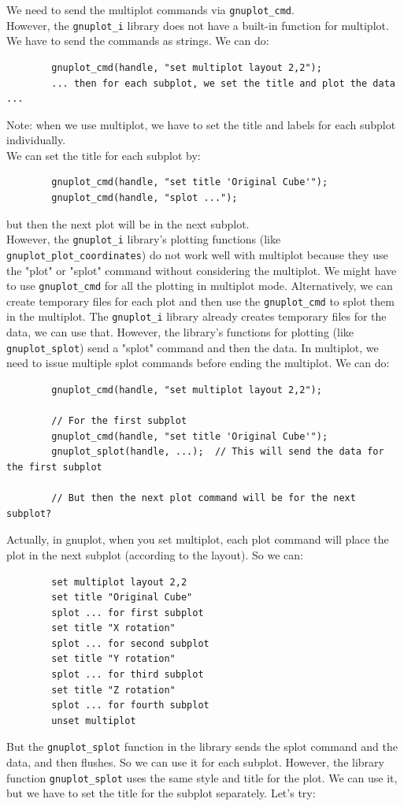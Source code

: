 \documentclass[a4paper,10pt]{article}
\begin{document}
We need to send the multiplot commands via \verb|gnuplot_cmd|.\\
However, the \verb|gnuplot_i| library does not have a built-in function for multiplot. We have to send the commands as strings.
We can do:
\begin{verbatim}
        gnuplot_cmd(handle, "set multiplot layout 2,2");
        ... then for each subplot, we set the title and plot the data ...
\end{verbatim}
Note: when we use multiplot, we have to set the title and labels for each subplot individually.\\
We can set the title for each subplot by:
\begin{verbatim}
        gnuplot_cmd(handle, "set title 'Original Cube'");
        gnuplot_cmd(handle, "splot ...");
\end{verbatim}
but then the next plot will be in the next subplot.\\
However, the \verb|gnuplot_i| library's plotting functions (like \verb|gnuplot_plot_coordinates|) do not work well with multiplot because they use the "plot" or "splot" command without considering the multiplot.
We might have to use \verb|gnuplot_cmd| for all the plotting in multiplot mode.
Alternatively, we can create temporary files for each plot and then use the \verb|gnuplot_cmd| to splot them in the multiplot.
The \verb|gnuplot_i| library already creates temporary files for the data, we can use that.
However, the library's functions for plotting (like \verb|gnuplot_splot|) send a "splot" command and then the data. In multiplot, we need to issue multiple splot commands before ending the multiplot.
We can do:
\begin{verbatim}
        gnuplot_cmd(handle, "set multiplot layout 2,2");

        // For the first subplot
        gnuplot_cmd(handle, "set title 'Original Cube'");
        gnuplot_splot(handle, ...);  // This will send the data for the first subplot

        // But then the next plot command will be for the next subplot?
\end{verbatim}
Actually, in gnuplot, when you set multiplot, each plot command will place the plot in the next subplot (according to the layout). So we can:
\begin{verbatim}
        set multiplot layout 2,2
        set title "Original Cube"
        splot ... for first subplot
        set title "X rotation"
        splot ... for second subplot
        set title "Y rotation"
        splot ... for third subplot
        set title "Z rotation"
        splot ... for fourth subplot
        unset multiplot
\end{verbatim}
But the \verb|gnuplot_splot| function in the library sends the splot command and the data, and then flushes. So we can use it for each subplot. However, the library function \verb|gnuplot_splot| uses the same style and title for the plot. We can use it, but we have to set the title for the subplot separately.
Let's try:\\
\end{document}
